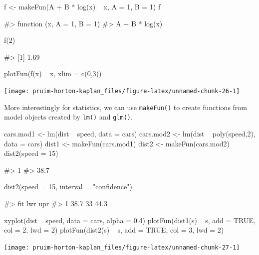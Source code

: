 \begin{Schunk}
\begin{Sinput}
f <- makeFun(A + B * log(x) ~ x, A = 1, B = 1)
f
\end{Sinput}
\begin{Soutput}
#> function (x, A = 1, B = 1) 
#> A + B * log(x)
\end{Soutput}
\begin{Sinput}
f(2)
\end{Sinput}
\begin{Soutput}
#> [1] 1.69
\end{Soutput}
\begin{Sinput}
plotFun(f(x) ~ x, xlim = c(0,3))
\end{Sinput}


\begin{center}\texttt{[image: pruim-horton-kaplan\_files/figure-latex/unnamed-chunk-26-1]} \end{center}

\end{Schunk}

More interestingly for statistics, we can use \texttt{makeFun()} to
create functions from model objects created by \texttt{lm()} and
\texttt{glm()}.

\begin{Schunk}
\begin{Sinput}
cars.mod1 <- lm(dist ~ speed, data = cars)
cars.mod2 <- lm(dist ~ poly(speed,2), data = cars)
dist1 <- makeFun(cars.mod1)
dist2 <- makeFun(cars.mod2)
dist2(speed = 15)
\end{Sinput}
\begin{Soutput}
#>    1 
#> 38.7
\end{Soutput}
\begin{Sinput}
dist2(speed = 15, interval = "confidence")
\end{Sinput}
\begin{Soutput}
#>    fit lwr  upr
#> 1 38.7  33 44.3
\end{Soutput}
\begin{Sinput}
xyplot(dist ~ speed, data = cars, alpha = 0.4)
plotFun(dist1(s) ~ s, add = TRUE, col = 2, lwd = 2)
plotFun(dist2(s) ~ s, add = TRUE, col = 3, lwd = 2)
\end{Sinput}


\begin{center}\texttt{[image: pruim-horton-kaplan\_files/figure-latex/unnamed-chunk-27-1]} \end{center}

\end{Schunk}

